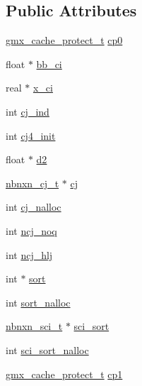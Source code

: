\subsection*{\-Public \-Attributes}
\begin{DoxyCompactItemize}
\item 
\hyperlink{structgmx__cache__protect__t}{gmx\-\_\-cache\-\_\-protect\-\_\-t} \hyperlink{structnbnxn__list__work_afb80cd0f418633577214d98eeef7cf32}{cp0}
\item 
float $\ast$ \hyperlink{structnbnxn__list__work_a42d61c8216b1ebea8356518aafb5f1b7}{bb\-\_\-ci}
\item 
real $\ast$ \hyperlink{structnbnxn__list__work_ae7df54d2ea2bb33d2414fb83e934f104}{x\-\_\-ci}
\item 
int \hyperlink{structnbnxn__list__work_ad6b0a16804628e79fe36131a39c8a9cf}{cj\-\_\-ind}
\item 
int \hyperlink{structnbnxn__list__work_a543cdc6df6cc92288801a643ee87d55f}{cj4\-\_\-init}
\item 
float $\ast$ \hyperlink{structnbnxn__list__work_a0a9fbc1309571bb06c57ddf19d5c4d14}{d2}
\item 
\hyperlink{structnbnxn__cj__t}{nbnxn\-\_\-cj\-\_\-t} $\ast$ \hyperlink{structnbnxn__list__work_a3595b4e33cf83e31f15fa3baf7357848}{cj}
\item 
int \hyperlink{structnbnxn__list__work_a24a7f3744f605951566bf8d47c262181}{cj\-\_\-nalloc}
\item 
int \hyperlink{structnbnxn__list__work_a76b51938c8f79f11a782d91fa6044a11}{ncj\-\_\-noq}
\item 
int \hyperlink{structnbnxn__list__work_aa77b33677c626504922eae06c445f6ae}{ncj\-\_\-hlj}
\item 
int $\ast$ \hyperlink{structnbnxn__list__work_a2a5788f5b253822c08ac92b030213b63}{sort}
\item 
int \hyperlink{structnbnxn__list__work_af56b3b9c154e55c081c82a2e2f559b08}{sort\-\_\-nalloc}
\item 
\hyperlink{structnbnxn__sci__t}{nbnxn\-\_\-sci\-\_\-t} $\ast$ \hyperlink{structnbnxn__list__work_aca14cc3ac02ac8609e10d24e4314ffc7}{sci\-\_\-sort}
\item 
int \hyperlink{structnbnxn__list__work_a0a2e2d441d977de82be591b523339002}{sci\-\_\-sort\-\_\-nalloc}
\item 
\hyperlink{structgmx__cache__protect__t}{gmx\-\_\-cache\-\_\-protect\-\_\-t} \hyperlink{structnbnxn__list__work_ac647d79c7eb868e19dd8b0b393328757}{cp1}
\end{DoxyCompactItemize}


